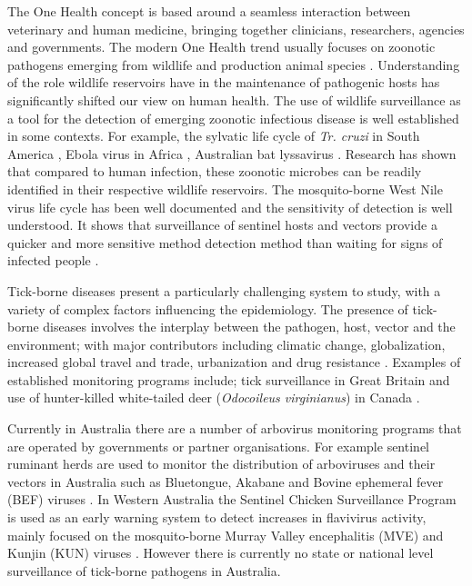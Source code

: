 \documentclass[a4paper, nobind]{templates/ociamthesis}
\begin{document}
The One Health concept is based around a seamless interaction between veterinary and human medicine, bringing together clinicians, researchers, agencies and governments.
The modern One Health trend usually focuses on zoonotic pathogens emerging from wildlife and production animal species \autocite{dayOneHealthImportance2011}.
Understanding of the role wildlife reservoirs have in the maintenance of pathogenic hosts has significantly shifted our view on human health.
The use of wildlife surveillance as a tool for the detection of emerging zoonotic infectious disease is well established in some contexts.
For example, the sylvatic life cycle of \emph{Tr. cruzi} in South America \autocite{denoyaEcologicalOverviewFactors2015}, Ebola virus in Africa \autocite{osterholmTransmissionEbolaViruses2015}, Australian bat lyssavirus \autocite{mayIdentificationFocusAreas2020}.
Research has shown that compared to human infection, these zoonotic microbes can be readily identified in their respective wildlife reservoirs.
The mosquito-borne West Nile virus life cycle has been well documented and the sensitivity of detection is well understood.
It shows that surveillance of sentinel hosts and vectors provide a quicker and more sensitive method detection method than waiting for signs of infected people \autocite{lemonGlobalInfectiousDisease2007}.

Tick-borne diseases present a particularly challenging system to study, with a variety of complex factors influencing the epidemiology.
The presence of tick-borne diseases involves the interplay between the pathogen, host, vector and the environment; with major contributors including climatic change, globalization, increased global travel and trade, urbanization and drug resistance \autocite{dantas-torresClimateChangeBiodiversity2015,kulesChallengesAdvancesDiagnosis2017,gilbertImpactsClimateChange2021}.
Examples of established monitoring programs include; tick surveillance in Great Britain \autocite{jamesonTickSurveillanceGreat2011,cullSurveillanceBritishTicks2018} and use of hunter-killed white-tailed deer (\emph{Odocoileus virginianus}) in Canada \autocite{bouchardHarvestedWhitetailedDeer2013}.

Currently in Australia there are a number of arbovirus monitoring programs that are operated by governments or partner organisations.
For example sentinel ruminant herds are used to monitor the distribution of arboviruses and their vectors in Australia such as Bluetongue, Akabane and Bovine ephemeral fever (BEF) viruses \autocite{nationalarbovirusmonitoringprogramNationalArbovirusMonitoring2019}.
In Western Australia the Sentinel Chicken Surveillance Program is used as an early warning system to detect increases in flavivirus activity, mainly focused on the mosquito-borne Murray Valley encephalitis (MVE) and Kunjin (KUN) viruses \autocite{departmentofhealthMedicalEntomologyAnnual2020}.
However there is currently no state or national level surveillance of tick-borne pathogens in Australia.
\end{document}
